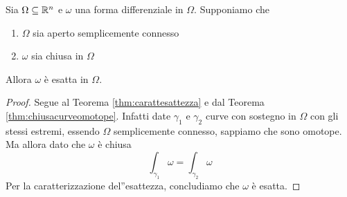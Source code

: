 \begin{thm} \label{thm:chiusaesatta}
	Sia $ \Omega \subseteq \mathbb{R}^n $ e $ \omega $ una forma differenziale in $ \Omega $. Supponiamo che
	\begin{enumerate}[label = (\roman*)]
		\item $ \Omega $ sia aperto semplicemente connesso
		\item $ \omega $ sia chiusa in $ \Omega $
	\end{enumerate}
	Allora $ \omega $ è esatta in $ \Omega $.
\end{thm}
%
\begin{proof}
	Segue al Teorema \ref{thm:carattesattezza} e dal Teorema \ref{thm:chiusacurveomotope}. Infatti date $ \gamma_1 $ e $ \gamma_2 $ curve con sostegno in $ \Omega $ con gli stessi estremi, essendo $ \Omega $ semplicemente connesso, sappiamo che sono omotope. Ma allora dato che $ \omega $ è chiusa
	\[
		\int_{\gamma_1} \omega = \int_{\gamma_2} \omega
	\]
	Per la caratterizzazione del''esattezza, concludiamo che $ \omega $ è esatta.
\end{proof}
